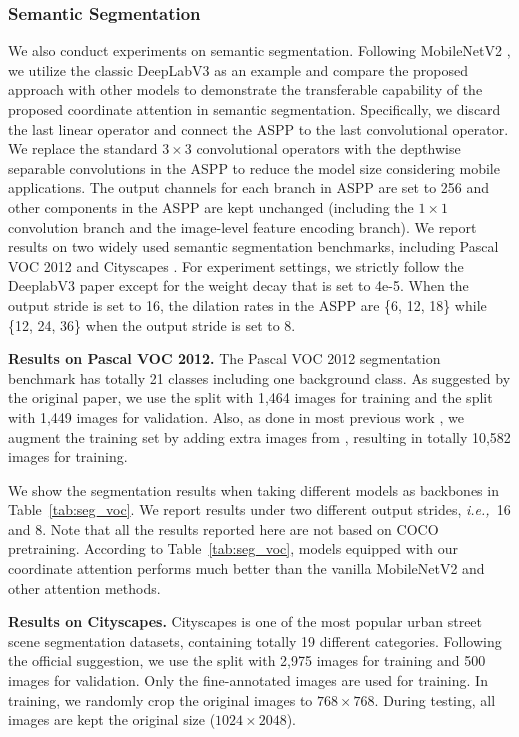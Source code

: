 \documentclass[final]{cvpr}
\def\ie{\emph{i.e.,~}}
\newcommand{\myPara}[1]{\vspace{.05in}\noindent\textbf{#1.}}
\begin{document}
\subsubsection{Semantic Segmentation}

We also conduct experiments on semantic segmentation.
%
Following MobileNetV2 \cite{sandler2018mobilenetv2},
we utilize the classic DeepLabV3 \cite{chen2017rethinking} 
as an example and compare the proposed approach with
other models to demonstrate the transferable capability of
the proposed coordinate attention in semantic segmentation.
%
Specifically, we discard the last linear operator and
connect the ASPP to the last convolutional operator.
%
We replace the standard $3\times3$ convolutional
operators with the depthwise separable convolutions
in the ASPP to reduce the model size considering mobile applications.
%
The output channels for each branch in ASPP are set to
256 and other components in the ASPP are kept unchanged
(including the $1\times1$ convolution branch and 
the image-level feature encoding branch).
%
We report results on two widely used semantic segmentation
benchmarks, including Pascal VOC 2012 \cite{everingham2015pascal}
and Cityscapes \cite{cordts2016cityscapes}.
%
For experiment settings, we strictly follow the DeeplabV3 
paper except for the weight decay that is set to 4e-5.
%
When the output stride is set to 16, the dilation rates
in the ASPP are \{6, 12, 18\} while \{12, 24, 36\}
when the output stride is set to 8.

\myPara{Results on Pascal VOC 2012}
%
The Pascal VOC 2012 segmentation benchmark has 
totally 21 classes including one background class.
%
As suggested by the original paper, we use the split 
with 1,464 images for training and the split with
1,449 images for validation.
%
Also, as done in most previous work
\cite{chen2017rethinking,chen2014semantic}, 
we augment the training set by adding extra images
from \cite{hariharan2011semantic},
resulting in totally 10,582 images for training.

We show the segmentation results when taking different models
as backbones in Table~\ref{tab:seg_voc}.
%
We report results under two different output strides, 
\ie 16 and 8.
%
Note that all the results reported here are not based on
COCO pretraining.
%
According to Table~\ref{tab:seg_voc}, models equipped with
our coordinate attention performs much better than the vanilla
MobileNetV2 and other attention methods.                 
%

\myPara{Results on Cityscapes} 
Cityscapes \cite{cordts2016cityscapes} is one of 
the most popular urban street scene segmentation
datasets, containing totally 19
different categories.
%
Following the official suggestion, we use
the split with 2,975 images for training and 500 images for validation. 
%
Only the fine-annotated images are used 
for training.
%
In training, we randomly crop the original
images to $768 \times 768$.
%
During testing, all images are kept 
the original size ($1024\times2048$).
%
\end{document}
